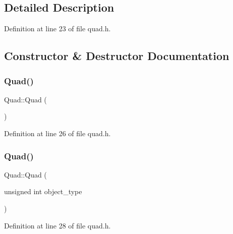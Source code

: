 \subsection{Detailed Description}


Definition at line 23 of file quad.\+h.



\subsection{Constructor \& Destructor Documentation}
\mbox{\label{class_quad_ae446d188d645cc5c512336f25d1a697a}} 
\subsubsection{\texorpdfstring{Quad()}{Quad()}\hspace{0.1cm}{\footnotesize\ttfamily [1/4]}}
{\footnotesize\ttfamily Quad\+::\+Quad (\begin{DoxyParamCaption}{ }\end{DoxyParamCaption})\hspace{0.3cm}{\ttfamily [inline]}}



Definition at line 26 of file quad.\+h.

\mbox{\label{class_quad_a8a0b4e52a52ac35a4a78fac3a0cd36b8}} 
\subsubsection{\texorpdfstring{Quad()}{Quad()}\hspace{0.1cm}{\footnotesize\ttfamily [2/4]}}
{\footnotesize\ttfamily Quad\+::\+Quad (\begin{DoxyParamCaption}\item[{unsigned int}]{object\+\_\+type }\end{DoxyParamCaption})\hspace{0.3cm}{\ttfamily [inline]}}



Definition at line 28 of file quad.\+h.

\mbox{\label{class_quad_aa22093808d9a84db2bf826ccacee415e}} 
